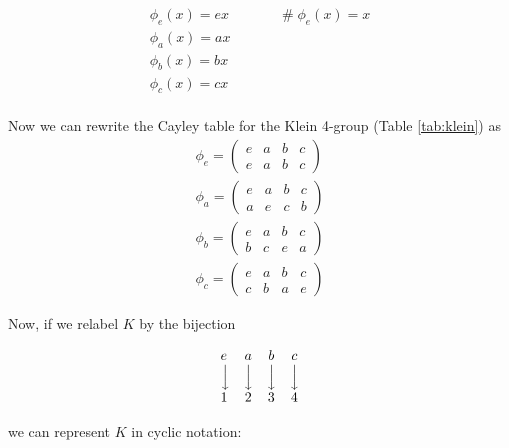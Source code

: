 \documentclass{article}
\theoremstyle{definition}
\DeclareMathOperator{\bda}{\Big \downarrow}						%
\begin{document}
\bigskip
\begin{equation*}
\begin{array}{llll}
\phi_{e}(x) = ex   &&&\quad  \mathrel{\#}  \phi_{e}(x) = x  \\     
\phi_{a}(x) = ax  \\    
\phi_{b}(x) = bx  \\       
\phi_{c}(x) = cx  \\                                        
\end{array}
\end{equation*}

\bigskip
\noindent
Now we can rewrite the Cayley table for the Klein 4-group (Table \ref{tab:klein}) as 
\bigskip
\begin{equation*}
\begin{array}{llll}
\phi_{e} = \begin{pmatrix} e & a & b & c \\ e & a & b & c \end{pmatrix}  \\
\phi_{a} = \begin{pmatrix} e & a & b & c \\ a & e & c & b \end{pmatrix}  \\
\phi_{b} = \begin{pmatrix} e & a & b & c \\ b & c & e & a \end{pmatrix}  \\
\phi_{c} = \begin{pmatrix} e & a & b & c \\ c & b & a & e \end{pmatrix}                                   
\end{array}
\end{equation*}

\bigskip
\noindent
Now, if we relabel $K$ by the bijection

\begin{equation*}
\begin{array}{l c c c c c c c c c c c c}
 e      & a       & b      & c \\
 \bda  & \bda & \bda & \bda \\
 1     & 2       & 3      & 4
\end{array}
\end{equation*}

\bigskip
\noindent
we can represent $K$ in cyclic notation:
\end{document}
